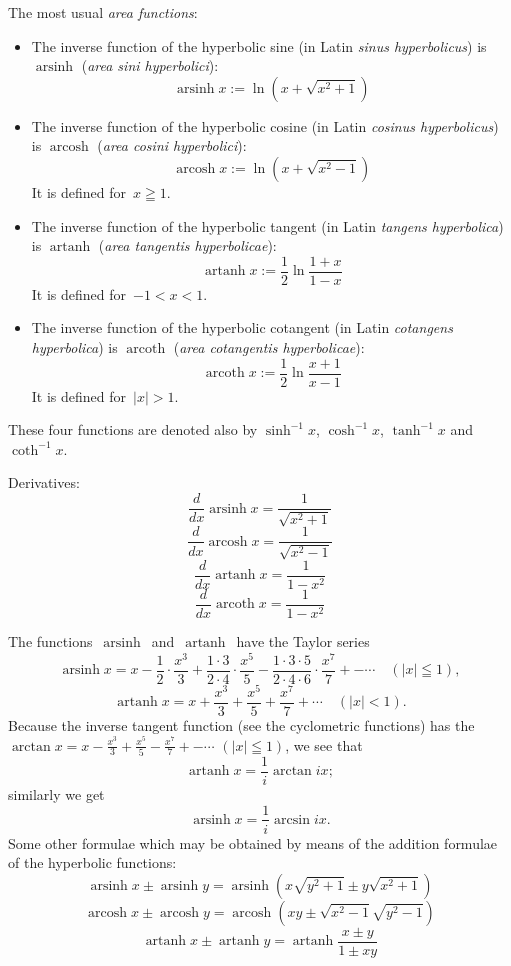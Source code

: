 \documentclass[12pt]{article}
\DeclareMathOperator{\arsinh}{arsinh}
\DeclareMathOperator{\arcosh}{arcosh}
\DeclareMathOperator{\artanh}{artanh}
\DeclareMathOperator{\arcoth}{arcoth}
\begin{document}
The most usual {\em area functions}:

\begin{itemize}
 \item The inverse function of the hyperbolic sine (in Latin {\em sinus hyperbolicus}) is $\arsinh$ ({\em area sini hyperbolici}):
          $$\arsinh{x} := \ln{(x+\sqrt{x^2+1})}$$

 \item The inverse function of the hyperbolic cosine (in Latin {\em cosinus hyperbolicus}) is $\arcosh$ ({\em area cosini hyperbolici}):
          $$\arcosh{x} := \ln(x+\sqrt{x^2-1})$$
It is defined for\, $x \geqq 1$.

 \item The inverse function of the hyperbolic tangent (in Latin {\em tangens hyperbolica}) is $\artanh$ ({\em area tangentis hyperbolicae}):
          $$\artanh{x} := \frac{1}{2}\ln \frac{1+x}{1-x}$$
It is defined for\, $-1 < x < 1$.

\item The inverse function of the hyperbolic cotangent (in Latin {\em cotangens hyperbolica}) is $\arcoth$ ({\em area cotangentis hyperbolicae}):
          $$\arcoth{x} := \frac{1}{2}\ln \frac{x+1}{x-1}$$
It is defined for\, $|x| > 1$.

\end{itemize}

These four functions are denoted also by $\sinh^{-1}x$, $\cosh^{-1}x$, $\tanh^{-1}x$ and $\coth^{-1}x$.

Derivatives:
    $$\frac{d}{dx} \arsinh x = \frac{1}{\sqrt{x^2\!+\!1}}$$
    $$\frac{d}{dx} \arcosh x = \frac{1}{\sqrt{x^2\!-\!1}}$$
    $$\frac{d}{dx} \artanh x = \frac{1}{1\!-\!x^2}$$
    $$\frac{d}{dx} \arcoth x = \frac{1}{1\!-\!x^2}$$

The functions\, $\arsinh$\, and\, $\artanh$\, have the  Taylor series
   $$\arsinh{x} = x-\frac{1}{2}\!\cdot\!\frac{x^3}{3}
+\frac{1\!\cdot\!3}{2\!\cdot\!4}\!\cdot\!\frac{x^5}{5}
-\frac{1\!\cdot\!3\!\cdot\!5}{2\!\cdot\!4\cdot\!6}\!\cdot\!\frac{x^7}{7}
+-\cdots\quad (|x|\leqq 1),$$
   $$\artanh x = x+\frac{x^3}{3}+\frac{x^5}{5}+\frac{x^7}{7}+\cdots 
\quad (|x| < 1).$$
Because the inverse tangent function (see the cyclometric functions) has the 
\, $\arctan x = x-\frac{x^3}{3}+\frac{x^5}{5}-\frac{x^7}{7}+-\cdots\,\, 
(|x|\leqq 1)$,
 we see that
   $$\artanh x = \frac{1}{i}\arctan ix;$$
similarly we get
   $$\arsinh x = \frac{1}{i}\arcsin ix.$$ 
Some other formulae which may be obtained by means of the addition formulae of the hyperbolic functions:
  $$\arsinh x\pm\arsinh y = \arsinh(x\sqrt{y^2\!+\!1}\pm y\sqrt{x^2\!+\!1})$$
  $$\arcosh x\pm\arcosh y = \arcosh(xy\pm\sqrt{x^2\!-\!1}\sqrt{y^2\!-\!1})$$
  $$\artanh x\pm\artanh y = \artanh\frac{x\pm y}{1\pm xy}$$
\end{document}
